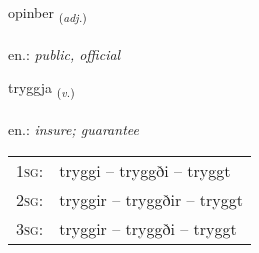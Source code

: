 \documentclass[frontgrid, backgrid]{flacards}\usepackage[]{graphicx}\usepackage[]{xcolor}
\begin{document}
{opinber \small{\textsubscript{(\textit{adj.})}} \\[1ex] %
\textphonetic{[ɔːpɪnpɛr]} \\
en.: \emph{public, official} \\  [2ex]
\renewcommand*{\arraystretch}{0.8}
}

\renewcommand{\flhead}{\vskip5pt \fboxsep=0pt {\small\bfseries\footnotesize Sagnorð | Verb}}
\renewcommand{\fcfoot}{\vskip5pt \fboxsep=0pt \hspace{2pt}{\small\bfseries\footnotesize 1K}}

\renewcommand{\blhead}{\vskip5pt {\small\bfseries\footnotesize Sagnorð | Verb }}
\renewcommand{\bcfoot}{\vskip5pt \hspace{2pt}{\small\bfseries\footnotesize 1K}}


{tryggja \small{\textsubscript{(\textit{v.})}} \\[1ex] %
\textphonetic{[tʰrɪca]} \\
en.: \emph{insure; guarantee} \\  [2ex]
\renewcommand*{\arraystretch}{0.8}
\begin{tabular}{p{1cm}l}
\textsc{1sg}: & tryggi -- tryggði -- tryggt \\ 
\textsc{2sg}: & tryggir -- tryggðir -- tryggt \\ 
\textsc{3sg}: & tryggir -- tryggði -- tryggt \\ 
\end{tabular}
}

\renewcommand{\flhead}{\vskip5pt \fboxsep=0pt {\small\bfseries\footnotesize Nafnorð | Noun}}
\renewcommand{\fcfoot}{\vskip5pt \fboxsep=0pt \hspace{2pt}{\small\bfseries\footnotesize 1K}}
\end{document}
